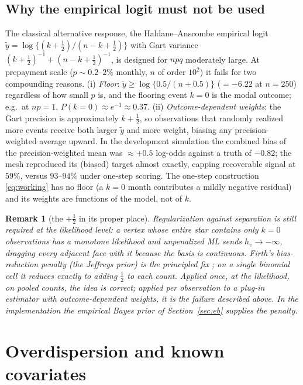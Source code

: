 \documentclass[11pt]{article}
\newtheorem{remark}[proposition]{Remark}
\begin{document}
\subsection{Why the empirical logit must not be used}\label{sec:empiricallogit}
The classical alternative response, the Haldane--Anscombe empirical logit
$\tilde y=\log\{(k+\tfrac12)/(n-k+\tfrac12)\}$ with Gart variance
$(k+\tfrac12)^{-1}+(n-k+\tfrac12)^{-1}$, is designed for $npq$ moderately large. At
prepayment scale ($p\sim 0.2$--$2\%$ monthly, $n$ of order $10^2$) it fails for two
compounding reasons. (i) \emph{Floor}: $\tilde y\ge \log\{0.5/(n+0.5)\}$
($=-6.22$ at $n=250$) regardless of how small $p$ is, and the flooring event $k=0$ is
the modal outcome; e.g.\ at $np=1$, $P(k{=}0)\approx e^{-1}\approx 0.37$. (ii)
\emph{Outcome-dependent weights}: the Gart precision is approximately $k+\tfrac12$, so
observations that randomly realized more events receive both larger $\tilde y$ and more
weight, biasing any precision-weighted average upward. In the development simulation the
combined bias of the precision-weighted mean was $\approx +0.5$ log-odds against a truth
of $-0.82$; the mesh reproduced its (biased) target almost exactly, capping recoverable
signal at $59\%$, versus $93$--$94\%$ under one-step scoring. The one-step construction
\eqref{eq:working} has no floor (a $k=0$ month contributes a mildly negative residual)
and its weights are functions of the model, not of $k$.

\begin{remark}[the $+\tfrac12$ in its proper place]
Regularization against separation is still required at the \emph{likelihood} level: a
vertex whose entire star contains only $k=0$ observations has a monotone likelihood and
unpenalized ML sends $h_v\to-\infty$, dragging every adjacent face with it because the
basis is continuous. Firth's bias-reduction penalty (the Jeffreys prior) is the
principled fix \cite{firth1993}; on a single binomial cell it reduces exactly to adding
$\tfrac12$ to each count. Applied once, at the likelihood, on pooled counts, the idea is
correct; applied per observation to a plug-in estimator with outcome-dependent weights,
it is the failure described above. In the implementation the empirical Bayes prior of
Section~\ref{sec:eb} supplies the penalty.
\end{remark}

\section{Overdispersion and known covariates}\label{sec:overdisp}
\end{document}
